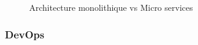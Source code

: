 \begin{figure}[H]
    \begin{center}
    \end{center}
    \caption{Architecture monolithique vs Micro services}
\end{figure}
\subsubsection{\selectfont\Large  DevOps}

